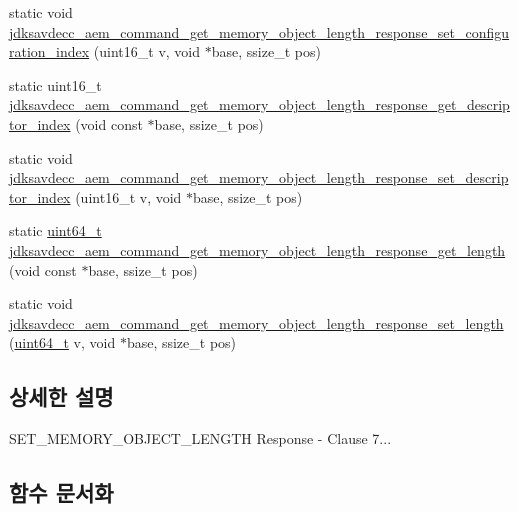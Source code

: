 \begin{DoxyCompactItemize}
\item 
static void \hyperlink{group__command__aem__get__memory__object__length__response_gacb32e9e2b876b7d46e88b4383d8c7108}{jdksavdecc\+\_\+aem\+\_\+command\+\_\+get\+\_\+memory\+\_\+object\+\_\+length\+\_\+response\+\_\+set\+\_\+configuration\+\_\+index} (uint16\+\_\+t v, void $\ast$base, ssize\+\_\+t pos)
\item 
static uint16\+\_\+t \hyperlink{group__command__aem__get__memory__object__length__response_gad2c41105b53030f88a6bc4195280bb14}{jdksavdecc\+\_\+aem\+\_\+command\+\_\+get\+\_\+memory\+\_\+object\+\_\+length\+\_\+response\+\_\+get\+\_\+descriptor\+\_\+index} (void const $\ast$base, ssize\+\_\+t pos)
\item 
static void \hyperlink{group__command__aem__get__memory__object__length__response_gaf7bf52245e978feefb96ab8270f61bed}{jdksavdecc\+\_\+aem\+\_\+command\+\_\+get\+\_\+memory\+\_\+object\+\_\+length\+\_\+response\+\_\+set\+\_\+descriptor\+\_\+index} (uint16\+\_\+t v, void $\ast$base, ssize\+\_\+t pos)
\item 
static \hyperlink{parse_8c_aec6fcb673ff035718c238c8c9d544c47}{uint64\+\_\+t} \hyperlink{group__command__aem__get__memory__object__length__response_ga57c102dc57c7097898e350421c202b6b}{jdksavdecc\+\_\+aem\+\_\+command\+\_\+get\+\_\+memory\+\_\+object\+\_\+length\+\_\+response\+\_\+get\+\_\+length} (void const $\ast$base, ssize\+\_\+t pos)
\item 
static void \hyperlink{group__command__aem__get__memory__object__length__response_ga5fa97036296f708bd1b47cd1babc5d5b}{jdksavdecc\+\_\+aem\+\_\+command\+\_\+get\+\_\+memory\+\_\+object\+\_\+length\+\_\+response\+\_\+set\+\_\+length} (\hyperlink{parse_8c_aec6fcb673ff035718c238c8c9d544c47}{uint64\+\_\+t} v, void $\ast$base, ssize\+\_\+t pos)
\end{DoxyCompactItemize}


\subsection{상세한 설명}
S\+E\+T\+\_\+\+M\+E\+M\+O\+R\+Y\+\_\+\+O\+B\+J\+E\+C\+T\+\_\+\+L\+E\+N\+G\+TH Response -\/ Clause 7... 

\subsection{함수 문서화}

